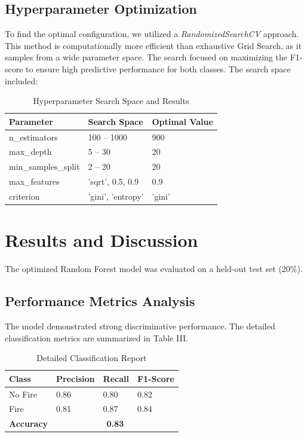 \documentclass[conference]{IEEEtran}
\begin{document}
\subsection{Hyperparameter Optimization}
To find the optimal configuration, we utilized a \textit{RandomizedSearchCV} approach. This method is computationally more efficient than exhaustive Grid Search, as it samples from a wide parameter space. The search focused on maximizing the F1-score to ensure high predictive performance for both classes. The search space included:
\begin{table}[h]
\caption{Hyperparameter Search Space and Results}
\centering
\begin{tabular}{@{}lll@{}}
\toprule
\textbf{Parameter} & \textbf{Search Space} & \textbf{Optimal Value} \\ \midrule
n\_estimators & 100 -- 1000 & 900 \\
max\_depth & 5 -- 30 & 20 \\
min\_samples\_split & 2 -- 20 & 20 \\
max\_features & 'sqrt', 0.5, 0.9 & 0.9 \\
criterion & 'gini', 'entropy' & 'gini' \\ \bottomrule
\end{tabular}
\end{table}

\section{Results and Discussion}
The optimized Random Forest model was evaluated on a held-out test set (20\%). 

\subsection{Performance Metrics Analysis}
The model demonstrated strong discriminative performance. The detailed classification metrics are summarized in Table III.

\begin{table}[h]
\caption{Detailed Classification Report}
\centering
\begin{tabular}{@{}llll@{}}
\toprule
\textbf{Class} & \textbf{Precision} & \textbf{Recall} & \textbf{F1-Score} \\ \midrule
No Fire & 0.86 & 0.80 & 0.82 \\
Fire & 0.81 & 0.87 & 0.84 \\ \midrule
\textbf{Accuracy} & \multicolumn{3}{c}{\textbf{0.83}} \\ \bottomrule
\end{tabular}
\end{table}
\end{document}
